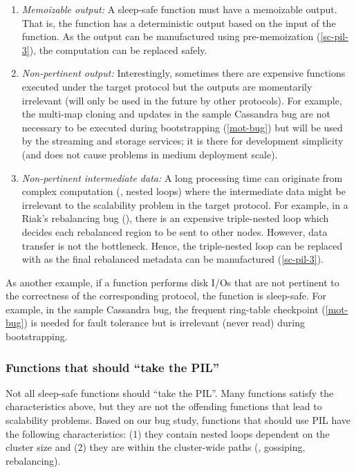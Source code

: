 \begin{enumerate}
\item {\em Memoizable output:} A sleep-safe function must have a
memoizable output.  That is, the function has a deterministic output based
on the input of the function.  As the output can be manufactured using
pre-memoization (\sec\ref{sc-pil-3}), the computation can be replaced
safely.

\item {\em Non-pertinent output:} Interestingly, sometimes there are expensive
functions executed under the target protocol but the outputs are momentarily
irrelevant (will only be used in the future by other protocols).  For example,
the multi-map cloning and updates in the sample Cassandra bug are not necessary
to be executed during bootstrapping (\sec\ref{mot-bug}) but will be used by the
streaming and storage services; it is there for development simplicity (and does
not cause problems in medium deployment scale).

\item {\em Non-pertinent intermediate data:} A long processing time can
originate from complex computation (\eg, nested  loops) where the
intermediate data might be irrelevant to the scalability problem in the target
protocol.  For example, in a Riak's rebalancing bug (\riakone), there is an
expensive triple-nested loop which decides each rebalanced region to be sent to
other nodes.  However, data transfer is not the bottleneck. Hence, the
triple-nested loop can be replaced with \sleep as the final rebalanced metadata
can be manufactured (\sec\ref{sc-pil-3}).  \end{enumerate}

As another example, if a function performs disk I/Os that are not pertinent to
the correctness of the corresponding protocol, the function is sleep-safe.  For
example, in the sample Cassandra bug, the frequent ring-table checkpoint
(\sec\ref{mot-bug}) is needed for fault tolerance but is irrelevant (never read)
during bootstrapping.

\subsubsection{Functions that should ``take the PIL''}
\label{sc-pil-2}

Not all sleep-safe functions should ``take the PIL''.  Many functions satisfy
the characteristics above, but they are not the offending functions that lead to
scalability problems.  Based on our bug study, functions that should use PIL
have the following  characteristics:
%
(1) they contain nested loops dependent on the cluster size
%
and (2) they are within the cluster-wide paths (\eg, gossiping, rebalancing).

